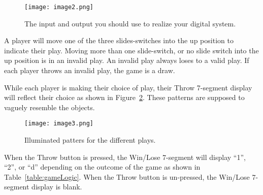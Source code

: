 \begin{figure}[ht]
\texttt{[image:  image2.png]}
\caption{The input and output you should use to realize your digital system.}
\label{figure:systemIO}
\end{figure}



A player will move one of the three slides-switches into the up position
to indicate their play. Moving more than one slide-switch, or no slide
switch into the up position is in an invalid play. An invalid play
always loses to a valid play. If each player throws an invalid play, the
game is a draw.

While each player is making their choice of play, their Throw 7-segment
display will reflect their choice as shown in Figure~\ref{figure:play7seg}. These patterns
are supposed to vaguely resemble the objects.

\begin{figure}[ht]
\texttt{[image: image3.png]}
\caption{Illuminated patters for the different plays.}
\label{figure:play7seg}
\end{figure}

When the Throw button is pressed, the Win/Lose 7-segment will display
``1'', ``2'', or ``d'' depending on the outcome of the game as shown in
Table~\ref{table:gameLogic}. When the Throw button is un-pressed, the Win/Lose 7-segment
display is blank.

